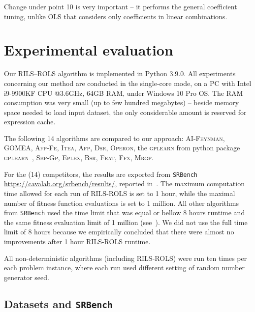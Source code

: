 \documentclass{bmcart}
\begin{document}
Change under point 10 is very important -- it performs the general coefficient tuning, unlike OLS that considers only coefficients in linear combinations.  

\section{Experimental evaluation}\label{sec:experiments}

Our \textsc{RILS}--\textsc{ROLS} algorithm is implemented in Python 3.9.0. All experiments concerning our method are conducted in the single-core mode, on a PC with Intel i9-9900KF CPU @3.6GHz, 64GB RAM, under Windows 10 Pro OS. The RAM consumption was very small (up to few hundred megabytes) -- beside memory space needed to load input dataset, the only considerable amount is reserved for expression cache. 


The following 14 algorithms are compared to our approach: \textsc{AI-Feynman}, \textsc{GOMEA}, \textsc{Afp-Fe}, \textsc{Itea}, \textsc{Afp}, \textsc{Dsr}, \textsc{Operon}, the \textsc{gplearn} from python package \textsc{gplearn}~\cite{stephens2016genetic}, \textsc{Sbp-Gp}, \textsc{Eplex}, \textsc{Bsr}, \textsc{Feat}, \textsc{Ffx}, \textsc{Mrgp}. 

For the (14) competitors, the results are exported from \texttt{SRBench} \url{https://cavalab.org/srbench/results/}, reported in~\cite{la2021contemporary}. 
The maximum computation time allowed for each run of \textsc{RILS}-\textsc{ROLS} is set to 1 hour, while the maximal number of fitness function evaluations is set to 1 million. All other algorithms from \texttt{SRBench} used the time limit that was equal or bellow 8 hours runtime and the same fitness evaluation limit of 1 million (see~\cite{la2021contemporary}). We did not use the full time limit of 8 hours because we empirically concluded that there were almost no improvements after 1 hour \textsc{RILS}-\textsc{ROLS} runtime.

All non-deterministic algorithms (including \textsc{RILS}-\textsc{ROLS}) were run ten times per each problem instance, where each run used different setting of random number generator seed. 

\subsection{Datasets and \texttt{SRBench}}
\end{document}
